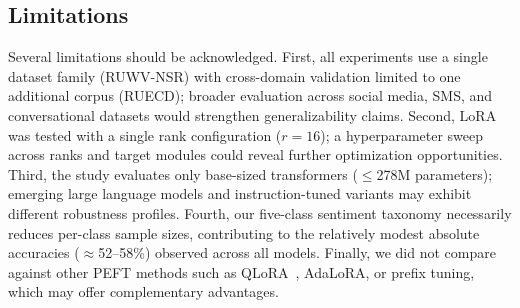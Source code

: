 \subsection{Limitations}
Several limitations should be acknowledged. First, all experiments use a single dataset family (RUWV-NSR) with cross-domain validation limited to one additional corpus (RUECD); broader evaluation across social media, SMS, and conversational datasets would strengthen generalizability claims. Second, LoRA was tested with a single rank configuration ($r=16$); a hyperparameter sweep across ranks and target modules could reveal further optimization opportunities. Third, the study evaluates only base-sized transformers ($\leq$278M parameters); emerging large language models and instruction-tuned variants may exhibit different robustness profiles. Fourth, our five-class sentiment taxonomy necessarily reduces per-class sample sizes, contributing to the relatively modest absolute accuracies ($\approx$52--58\%) observed across all models. Finally, we did not compare against other PEFT methods such as QLoRA~\cite{dettmers2023qlora}, AdaLoRA, or prefix tuning, which may offer complementary advantages.
